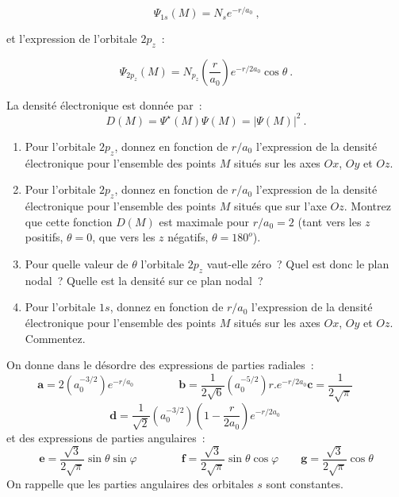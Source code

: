 $$
\Psi_{1s}(M)=N_s e^{-r/a_0} \ \text{,}
$$

et l'expression de l'orbitale $2p_z$~: 

$$
\Psi_{2p_z}(M)=
N_{p_z}\left(\frac{r}{a_0}\right)e^{-r/2a_0}\cos{\theta} \ .
$$

La densit\'e \'electronique est donn\'ee par~:
$$
D(M)=\Psi^\star(M)\Psi(M)=|\Psi(M)|^2  \ .
$$

\begin{enumerate}

\item Pour l'orbitale $2p_z$, donnez en fonction de $r/a_0$ l'expression de la 
densit\'e \'electronique pour l'ensemble des points $M$ situ\'es sur les axes $Ox$, $Oy$ et $Oz$.

\item Pour l'orbitale $2p_z$, donnez en fonction de $r/a_0$ l'expression de la 
densit\'e \'electronique pour l'ensemble des points $M$ situ\'es que sur l'axe $Oz$. 
Montrez que cette fonction $D(M)$ est maximale pour $r/a_0=2$ 
(tant vers les $z$ positifs, $\theta=0$, que vers les $z$ n\'egatifs, $\theta=180^o$).

\item Pour quelle valeur de $\theta$ l'orbitale $2p_z$ vaut-elle z\'ero~? Quel est donc le plan nodal~?
Quelle est la densit\'e sur ce plan nodal~?

\item Pour l'orbitale $1s$, donnez en fonction de $r/a_0$ l'expression de la densit\'e 
\'electronique pour l'ensemble des points $M$ situ\'es sur les axes $Ox$, $Oy$ et $Oz$. 
Commentez.
\end{enumerate}

%


On donne dans le d\'esordre des expressions de parties radiales~:
$$
\textbf{a}=2\left(a_0^{-3/2}\right)e^{-r/a_0} \qquad \qquad
\textbf{b}=\frac{1}{2\sqrt{6}}\left(a_0^{-5/2}\right)r.e^{-r/2a_0}
\textbf{c}=\frac{1}{2\sqrt{\pi}}\qquad
$$
$$
\textbf{d}=\frac{1}{\sqrt{2}}\left(a_0^{-3/2}\right)\left(1-\frac{r}{2a_0}\right)e^{-r/2a_0}\qquad
$$
et des expressions de parties angulaires~:\\
$$
\textbf{e}=\frac{\sqrt{3}}{2\sqrt{\pi}}\sin{\theta}\sin{\varphi} \qquad \qquad
\textbf{f}=\frac{\sqrt{3}}{2\sqrt{\pi}}\sin{\theta}\cos{\varphi}\qquad
\textbf{g}=\frac{\sqrt{3}}{2\sqrt{\pi}}\cos{\theta}
$$
On rappelle que les parties angulaires des orbitales $s$ sont constantes.

